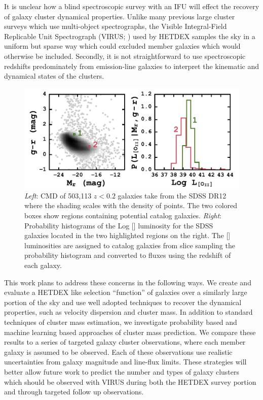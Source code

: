 It is unclear how a blind spectroscopic survey with an IFU will effect the recovery of galaxy cluster dynamical properties. Unlike many previous large cluster surveys  which use multi-object spectrographs, the Visible Integral-Field Replicable Unit Spectrograph (VIRUS; \citealt{Hill2012}) used by HETDEX samples the sky in a uniform but sparse way which could excluded member galaxies which would otherwise be included. Secondly, it is not straightforward to use spectroscopic redshifts predominately from emission-line galaxies to interpret the kinematic and dynamical states of the clusters.

\begin{figure}[t]
	\begin{centering}
		\includegraphics[width=\textwidth]{figures1/oii_sdss.pdf} 
	\end{centering}
	\caption[Illustration of the probability based \hbox{[]} flux prediction method.]{\textit{Left}: CMD of 503,113 $z<0.2$ galaxies take from the SDSS DR12 where the shading scales with the density of points. The two colored boxes show regions containing potential catalog galaxies. \textit{Right}: Probability histograms of the Log \hbox{[]} luminosity for the SDSS galaxies located in the two highlighted regions on the right. The \hbox{[]} luminosities are assigned to catalog galaxies from slice sampling the probability histogram and converted to fluxes using the redshift of each galaxy.}
	\label{fig: oii sdss} 
\end{figure}

This work plans to address these concerns in the following ways. We create and evaluate a HETDEX like selection ``function'' of galaxies over a similarly large portion of the sky and use well adopted techniques to recover the dynamical properties, such as velocity dispersion and cluster mass. In addition to standard techniques of cluster mass estimation, we investigate probability based and machine learning based approaches of cluster mass prediction. We compare these results to a series of targeted galaxy cluster observations, where each member galaxy is assumed to be observed. Each of these observations use realistic uncertainties from galaxy magnitude and line-flux limits. These strategies will better allow future work to predict the number and types of galaxy clusters which should be observed with VIRUS during both the HETDEX survey portion and through targeted follow up observations.

